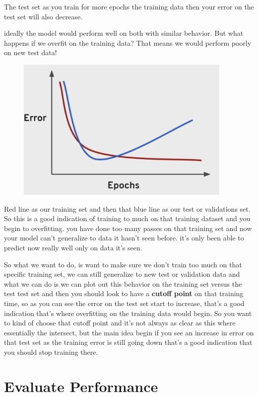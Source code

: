 \documentclass[12pt]{article}
\begin{document}
\begin{itemize}
	The test set as you train for more epochs the training data then your error on the test set will also decrease. \newpage
	
	ideally the model would perform well on both with similar behavior. But what happens if we overfit on the training data? That means we would perform poorly on new test data!
	
\begin{figure}[htbp]
\centerline{\includegraphics[scale=.5]{img/poorPerform.jpg}}
\end{figure}

	Red line as our training set and then that blue line as our test or validations set.\\
	
	So this is a good indication of training to much on that training dataset and you begin to overfitting. you have done too many passes on that training set and now your model can't generalize to data it hasn't seen before. it's only been able to predict now really well only on data it's seen.
	
	So what we want to do, is want to make sure we don't train too much on that specific training set, we can still generalize to new test or validation data and what we can do is we can plot out this behavior on the training set versus the test test set and then you should look to have a \textbf{cutoff point} on that training time, so as you can see the error on the test set start to increase, that's a good indication that's where overfitting on the training data would begin. So you want to kind of choose that cutoff point and it's not always as clear as this where essentially the intersect, but the main idea begin if you see an increase in error on that test set as the training error is still going down that's a good indication that you should stop training there.
\end{itemize}

\section{Evaluate Performance}
\end{document}
